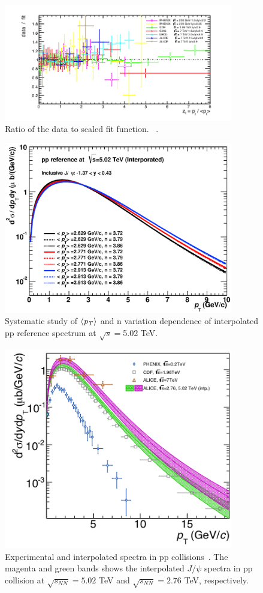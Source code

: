 \begin{figure}[!h]
  \centering
  \includegraphics[width=10cm]{chap4/figure/ppref/datatofit.png}
  \caption{Ratio of the data to scaled fit function. ~\cite{bib_jpsippref}. 
  }
  \label{fig_4_ppfitratio}
\end{figure}
\begin{figure}[!h]
  \centering
  \includegraphics[width=10cm]{chap4/figure/ppref/ppref5TeV_uncorrsys.eps}
  \caption{Systematic study of $\langle \it{p}_{T}\rangle$ and n variation dependence of interpolated pp reference spectrum at $\sqrt{s}=$5.02 TeV. }
  \label{fig_4_ppsys}
\end{figure}
\begin{figure}[!h]
  \centering
  \includegraphics[width=10cm]{chap4/figure/ppref/ppspectra.png}
  \caption{Experimental and interpolated spectra in pp collisions~\cite{bib_jpsippref}. The magenta and green bands shows the interpolated $J/\psi$ spectra in pp collision at $\sqrt{s_{NN}}=5.02$ TeV and $\sqrt{s_{NN}}=2.76$ TeV, respectively.}
  \label{fig_4_ppref}
\end{figure}

